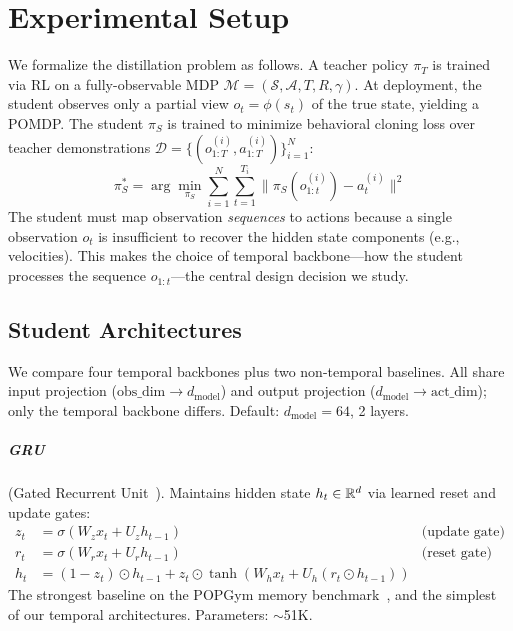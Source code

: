 \chapter{Experimental Setup}
\label{ch:setup}

We formalize the distillation problem as follows.
A teacher policy $\pi_T$ is trained via RL on a fully-observable MDP $\mathcal{M} = (\mathcal{S}, \mathcal{A}, T, R, \gamma)$.
At deployment, the student observes only a partial view $o_t = \phi(s_t)$ of the true state, yielding a POMDP.
The student $\pi_S$ is trained to minimize behavioral cloning loss over teacher demonstrations $\mathcal{D} = \{(o_{1:T}^{(i)}, a_{1:T}^{(i)})\}_{i=1}^N$:
\begin{equation}
  \pi_S^* = \arg\min_{\pi_S} \sum_{i=1}^N \sum_{t=1}^{T_i} \| \pi_S(o_{1:t}^{(i)}) - a_t^{(i)} \|^2
  \label{eq:bc}
\end{equation}
The student must map observation \emph{sequences} to actions because a single observation $o_t$ is insufficient to recover the hidden state components (e.g., velocities).
This makes the choice of temporal backbone---how the student processes the sequence $o_{1:t}$---the central design decision we study.

\section{Student Architectures}
\label{sec:architectures}

We compare four temporal backbones plus two non-temporal baselines.
All share input projection ($\text{obs\_dim} \to d_\text{model}$) and output projection ($d_\text{model} \to \text{act\_dim}$); only the temporal backbone differs.
Default: $d_\text{model} = 64$, 2 layers.

\paragraph{GRU} (Gated Recurrent Unit~\citep{cho2014gru}).
Maintains hidden state $h_t \in \mathbb{R}^{d}$ via learned reset and update gates:
\begin{align}
  z_t &= \sigma(W_z x_t + U_z h_{t-1}) & \text{(update gate)} \\
  r_t &= \sigma(W_r x_t + U_r h_{t-1}) & \text{(reset gate)} \\
  h_t &= (1 - z_t) \odot h_{t-1} + z_t \odot \tanh(W_h x_t + U_h (r_t \odot h_{t-1}))
\end{align}
The strongest baseline on the POPGym memory benchmark~\citep{morad2023popgym}, and the simplest of our temporal architectures. Parameters: $\sim$51K.

